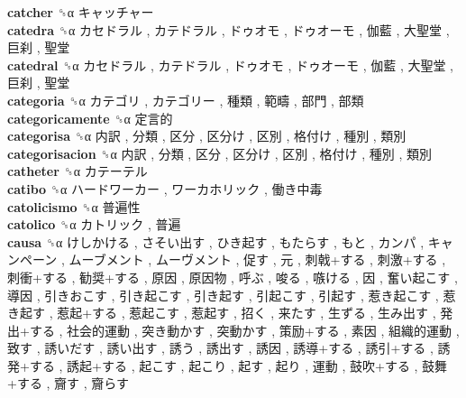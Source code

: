 \textbf{catcher} ␝α   キャッチャー   \\
\textbf{catedra} ␝α   カセドラル ,  カテドラル ,  ドゥオモ ,  ドゥオーモ ,  伽藍 ,  大聖堂 ,  巨刹 ,  聖堂   \\
\textbf{catedral} ␝α   カセドラル ,  カテドラル ,  ドゥオモ ,  ドゥオーモ ,  伽藍 ,  大聖堂 ,  巨刹 ,  聖堂   \\
\textbf{categoria} ␝α   カテゴリ ,  カテゴリー ,  種類 ,  範疇 ,  部門 ,  部類   \\
\textbf{categoricamente} ␝α   定言的   \\
\textbf{categorisa} ␝α   内訳 ,  分類 ,  区分 ,  区分け ,  区別 ,  格付け ,  種別 ,  類別   \\
\textbf{categorisacion} ␝α   内訳 ,  分類 ,  区分 ,  区分け ,  区別 ,  格付け ,  種別 ,  類別   \\
\textbf{catheter} ␝α   カテーテル   \\
\textbf{catibo} ␝α   ハードワーカー ,  ワーカホリック ,  働き中毒   \\
\textbf{catolicismo} ␝α   普遍性   \\
\textbf{catolico} ␝α   カトリック ,  普遍   \\
\textbf{causa} ␝α   けしかける ,  さそい出す ,  ひき起す ,  もたらす ,  もと ,  カンパ ,  キャンペーン ,  ムーブメント ,  ムーヴメント ,  促す ,  元 ,  刺戟+する ,  刺激+する ,  刺衝+する ,  勧奨+する ,  原因 ,  原因物 ,  呼ぶ ,  唆る ,  嗾ける ,  因 ,  奮い起こす ,  導因 ,  引きおこす ,  引き起こす ,  引き起す ,  引起こす ,  引起す ,  惹き起こす ,  惹き起す ,  惹起+する ,  惹起こす ,  惹起す ,  招く ,  来たす ,  生ずる ,  生み出す ,  発出+する ,  社会的運動 ,  突き動かす ,  突動かす ,  策励+する ,  素因 ,  組織的運動 ,  致す ,  誘いだす ,  誘い出す ,  誘う ,  誘出す ,  誘因 ,  誘導+する ,  誘引+する ,  誘発+する ,  誘起+する ,  起こす ,  起こり ,  起す ,  起り ,  運動 ,  鼓吹+する ,  鼓舞+する ,  齎す ,  齎らす   \\
